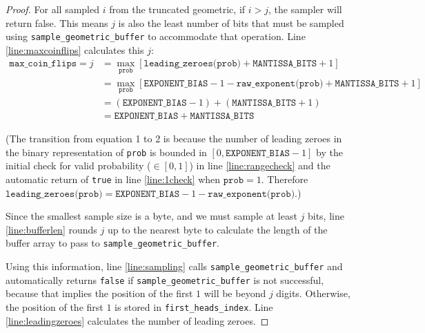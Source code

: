 \documentclass[11pt,a4paper]{article}
\theoremstyle{definition}
\begin{document}
\begin{proof}

For all sampled $i$ from the truncated geometric, if $i > j$, the sampler will return false. This means $j$ is also the least number of bits that must be sampled using \texttt{sample\_geometric\_buffer} to accommodate that operation. Line \ref{line:maxcoinflips} calculates this $j$:
\begin{align}
    \texttt{max\_coin\_flips} = j & = \max_{\texttt{prob}}[\texttt{leading\_zeroes(prob)} + \texttt{MANTISSA\_BITS} + 1] \\
    & = \max_{\texttt{prob}}[\texttt{EXPONENT\_BIAS} - 1 - \texttt{raw\_exponent(prob)} + \texttt{MANTISSA\_BITS} + 1] \\
    & = (\texttt{EXPONENT\_BIAS} - 1) + (\texttt{MANTISSA\_BITS} + 1) \\
    & = \texttt{EXPONENT\_BIAS} + \texttt{MANTISSA\_BITS}
\end{align}


(The transition from equation 1 to 2 is because the number of leading zeroes in the binary representation of \texttt{prob} is bounded in $[0, \texttt{EXPONENT\_BIAS} - 1]$ by the initial check for valid probability ($\in [0, 1]$) in line \ref{line:rangecheck} and the automatic return of \texttt{true} in line \ref{line:1check} when $\texttt{prob} = 1$. Therefore $\texttt{leading\_zeroes(prob)} = \texttt{EXPONENT\_BIAS} - 1 - \texttt{raw\_exponent(prob)}$.) 

Since the smallest sample size is a byte, and we must sample at least $j$ bits, line \ref{line:bufferlen} rounds $j$ up to the nearest byte to calculate the length of the buffer array to pass to \texttt{sample\_geometric\_buffer}. 

Using this information, line \ref{line:sampling} calls \texttt{sample\_geometric\_buffer} and automatically returns \texttt{false} if \texttt{sample\_geometric\_buffer} is not successful, because that implies the position of the first $1$ will be beyond $j$ digits. Otherwise, the position of the first $1$ is stored in \texttt{first\_heads\_index}. Line \ref{line:leadingzeroes} calculates the number of leading zeroes.


\end{proof}
\end{document}
